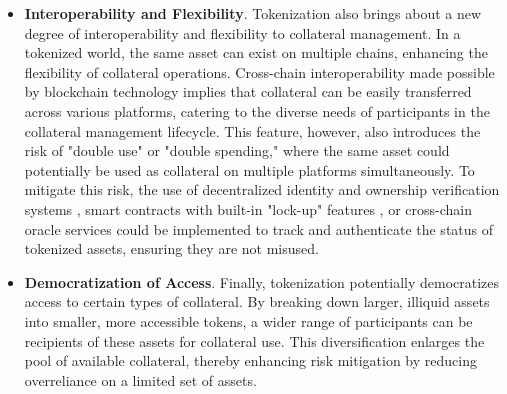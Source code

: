\begin{itemize}
    \item \textbf{Interoperability and Flexibility}. Tokenization also brings about a new degree of interoperability and flexibility to collateral management. In a tokenized world, the same asset can exist on multiple chains, enhancing the flexibility of collateral operations. Cross-chain interoperability made possible by blockchain technology implies that collateral can be easily transferred across various platforms, catering to the diverse needs of participants in the collateral management lifecycle. This feature, however, also introduces the risk of "double use" or "double spending," where the same asset could potentially be used as collateral on multiple platforms simultaneously. To mitigate this risk, the use of decentralized identity and ownership verification systems \citep{dib2020decentralized}, smart contracts with built-in "lock-up" features \citep{token_lockup}, or cross-chain oracle services \citep{crosschain_oracles} could be implemented to track and authenticate the status of tokenized assets, ensuring they are not misused.

    \item \textbf{Democratization of Access}. Finally, tokenization potentially democratizes access to certain types of collateral. By breaking down larger, illiquid assets into smaller, more accessible tokens, a wider range of participants can be recipients of these assets for collateral use. This diversification enlarges the pool of available collateral, thereby enhancing risk mitigation by reducing overreliance on a limited set of assets.

\end{itemize}